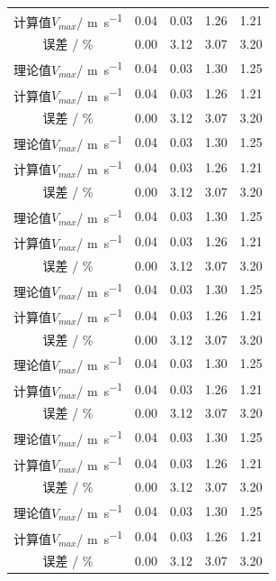 \documentclass[bachelor]{XJTUthesis}
\begin{document}
\begin{longtable}{ccccc}
    计算值$V_{max}$/ \si{m.s^{-1}} & 0.04 & 0.03 & 1.26 & 1.21\\
    误差 / \%                      & 0.00 & 3.12 & 3.07 & 3.20\\
    理论值$V_{max}$/ \si{m.s^{-1}} & 0.04 & 0.03 & 1.30 & 1.25 \\
    计算值$V_{max}$/ \si{m.s^{-1}} & 0.04 & 0.03 & 1.26 & 1.21\\
    误差 / \%                      & 0.00 & 3.12 & 3.07 & 3.20\\
    理论值$V_{max}$/ \si{m.s^{-1}} & 0.04 & 0.03 & 1.30 & 1.25 \\
    计算值$V_{max}$/ \si{m.s^{-1}} & 0.04 & 0.03 & 1.26 & 1.21\\
    误差 / \%                      & 0.00 & 3.12 & 3.07 & 3.20\\
    理论值$V_{max}$/ \si{m.s^{-1}} & 0.04 & 0.03 & 1.30 & 1.25 \\
    计算值$V_{max}$/ \si{m.s^{-1}} & 0.04 & 0.03 & 1.26 & 1.21\\
    误差 / \%                      & 0.00 & 3.12 & 3.07 & 3.20\\
    理论值$V_{max}$/ \si{m.s^{-1}} & 0.04 & 0.03 & 1.30 & 1.25 \\
    计算值$V_{max}$/ \si{m.s^{-1}} & 0.04 & 0.03 & 1.26 & 1.21\\
    误差 / \%                      & 0.00 & 3.12 & 3.07 & 3.20\\
    理论值$V_{max}$/ \si{m.s^{-1}} & 0.04 & 0.03 & 1.30 & 1.25 \\
    计算值$V_{max}$/ \si{m.s^{-1}} & 0.04 & 0.03 & 1.26 & 1.21\\
    误差 / \%                      & 0.00 & 3.12 & 3.07 & 3.20\\
    理论值$V_{max}$/ \si{m.s^{-1}} & 0.04 & 0.03 & 1.30 & 1.25 \\
    计算值$V_{max}$/ \si{m.s^{-1}} & 0.04 & 0.03 & 1.26 & 1.21\\
    误差 / \%                      & 0.00 & 3.12 & 3.07 & 3.20\\
    理论值$V_{max}$/ \si{m.s^{-1}} & 0.04 & 0.03 & 1.30 & 1.25 \\
    计算值$V_{max}$/ \si{m.s^{-1}} & 0.04 & 0.03 & 1.26 & 1.21\\
    误差 / \%                      & 0.00 & 3.12 & 3.07 & 3.20\\                      
    \bottomrule
\end{longtable}
\end{document}
